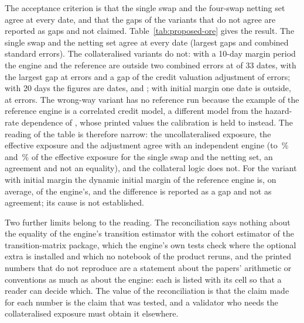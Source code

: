 The acceptance criterion is that the single swap and the four-swap netting set agree at every date, and that the gaps of the variants that
do not agree are reported as gaps and not claimed. Table~\ref{tab:proposed-ore} gives the result. The single swap and the netting set agree
at every date (largest gaps \pxTwoSingleMax{} and \pxTwoNettingMax{} combined standard errors). The collateralised variants do not: with a
10-day margin period the engine and the reference are outside two combined errors at \pxTwoCsaTenOut{} of 33 dates, with the largest gap
at \pxTwoCsaTenMax{} errors and a gap of the credit valuation adjustment of \pxTwoCsaTenCva{} errors; with 20 days the figures are
\pxTwoCsaTwentyOut{} dates, \pxTwoCsaTwentyMax{} and \pxTwoCsaTwentyCva{}; with initial margin one date is outside, at \pxTwoImMax{} errors.
The wrong-way variant has no reference run because the example of the reference engine is a correlated credit model, a different model from the
hazard-rate dependence of \citet{ccr:hullwhite2012}, whose printed values the calibration is held to instead. The reading of the table is
therefore narrow: the uncollateralised exposure, the effective exposure and the adjustment agree with an independent engine (to \pxPpTwoSingle{}\,\% and \pxPpTwoNetting{}\,\% of
the effective exposure for the single swap and the netting set, an agreement and not an equality), and the collateral logic does not. For the variant with initial margin the dynamic initial margin of the reference engine is, on average, \pxTwoImDimRatio{} of the engine's, and the difference is reported as a gap and not as agreement; its cause is not established.

Two further limits belong to the reading. The reconciliation says nothing about the equality of the engine's transition estimator with the cohort estimator of the transition-matrix
package, which the engine's own tests check where the optional extra is installed and which no notebook of the product reruns, and the printed numbers that do not reproduce are a statement about
the papers' arithmetic or conventions as much as about the engine: each is listed with its cell so that a reader can decide which. The value of the reconciliation is
that the claim made for each number is the claim that was tested, and a validator who needs the collateralised exposure must obtain it elsewhere.

